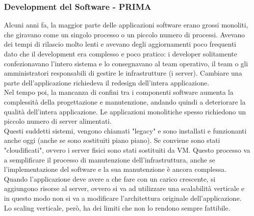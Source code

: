 \documentclass{article}
\begin{document}
\subsubsection{Development del Software - PRIMA}
Alcuni anni fa, la maggior parte delle applicazioni software erano grossi monoliti, che giravano come un singolo processo o un piccolo numero di processi. Avevano dei tempi di rilascio molto lenti e avevano degli aggiornamenti poco frequenti dato che il development era complesso e poco pratico: i developer solitamente confezionavano l'intero sistema e lo consegnavano al team operativo, il team o gli amministratori responsabili di gestire le infrastrutture (i server). Cambiare una parte dell'applicazione richiedeva il redesign dell'intera applicazione. \\
Nel tempo poi, la mancanza di confini tra i componenti software aumenta la complessità della progettazione e manutenzione, andando quindi a deteriorare la qualità dell'intera applicazione. Le applicazioni monolitiche spesso richiedono un piccolo numero di server alimentati. \\
Questi suddetti sistemi, vengono chiamati "legacy" e sono installati e funzionanti anche oggi (anche se sono sostituiti piano piano). Se conviene sono stati "cloudificati", ovvero i server fisici sono stati sostituiti da VM. Questo processo va a semplificare il processo di manutenzione dell'infrastruttura, anche se l'implementazione del software e la sua manutenzione è ancora complessa. \\
Quando l'applicazione deve avere a che fare con un carico crescente, si aggiungono risorse al server, ovvero si va ad utilizzare una scalabilità verticale e in questo modo non si va a modificare l'architettura originale dell'applicazione. Lo scaling verticale, però, ha dei limiti che non lo rendono sempre fattibile.
\end{document}
